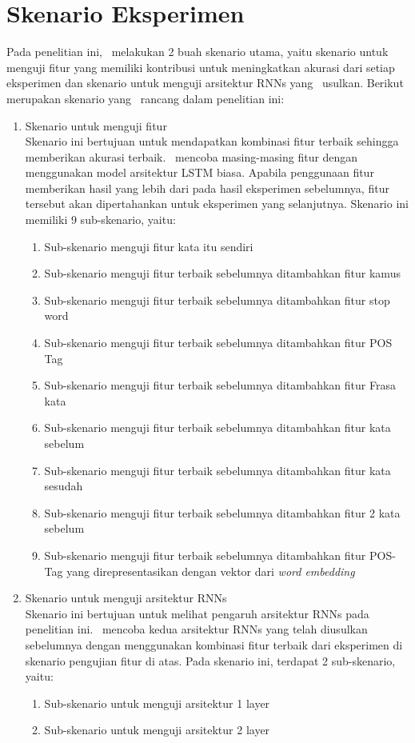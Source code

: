 \section{Skenario Eksperimen}
Pada penelitian ini, \saya~melakukan 2 buah skenario utama, yaitu skenario untuk menguji fitur yang memiliki kontribusi untuk meningkatkan akurasi dari setiap eksperimen dan skenario untuk menguji arsitektur RNNs yang \saya~usulkan. Berikut merupakan skenario yang \saya~rancang dalam penelitian ini:
\begin{enumerate}
	\item Skenario untuk menguji fitur\\
	Skenario ini bertujuan untuk mendapatkan kombinasi fitur terbaik sehingga memberikan akurasi terbaik. \Saya~mencoba masing-masing fitur dengan menggunakan model arsitektur LSTM biasa. Apabila penggunaan fitur memberikan hasil yang lebih dari pada hasil eksperimen sebelumnya, fitur tersebut akan dipertahankan untuk eksperimen yang selanjutnya. Skenario ini memiliki 9 sub-skenario, yaitu:
	\begin{enumerate}
		\item Sub-skenario menguji fitur kata itu sendiri
		\item Sub-skenario menguji fitur terbaik sebelumnya ditambahkan fitur kamus
		\item Sub-skenario menguji fitur terbaik sebelumnya ditambahkan fitur stop word
		\item Sub-skenario menguji fitur terbaik sebelumnya ditambahkan fitur POS Tag
		\item Sub-skenario menguji fitur terbaik sebelumnya ditambahkan fitur Frasa kata
		\item Sub-skenario menguji fitur terbaik sebelumnya ditambahkan fitur kata sebelum
		\item Sub-skenario menguji fitur terbaik sebelumnya ditambahkan fitur kata sesudah
		\item Sub-skenario menguji fitur terbaik sebelumnya ditambahkan fitur 2 kata sebelum
		\item Sub-skenario menguji fitur terbaik sebelumnya ditambahkan fitur POS-Tag yang direpresentasikan dengan vektor dari \textit{word embedding}
	\end{enumerate}
	\item Skenario untuk menguji arsitektur RNNs\\
	Skenario ini bertujuan untuk melihat pengaruh arsitektur RNNs pada penelitian ini. \Saya~mencoba kedua arsitektur RNNs yang telah diusulkan sebelumnya dengan menggunakan kombinasi fitur terbaik dari eksperimen di skenario pengujian fitur di atas. Pada skenario ini, terdapat 2 sub-skenario, yaitu:
	\begin{enumerate}
		\item Sub-skenario untuk menguji arsitektur 1 layer
		\item Sub-skenario untuk menguji arsitektur 2 layer
	\end{enumerate}
	
\end{enumerate}

